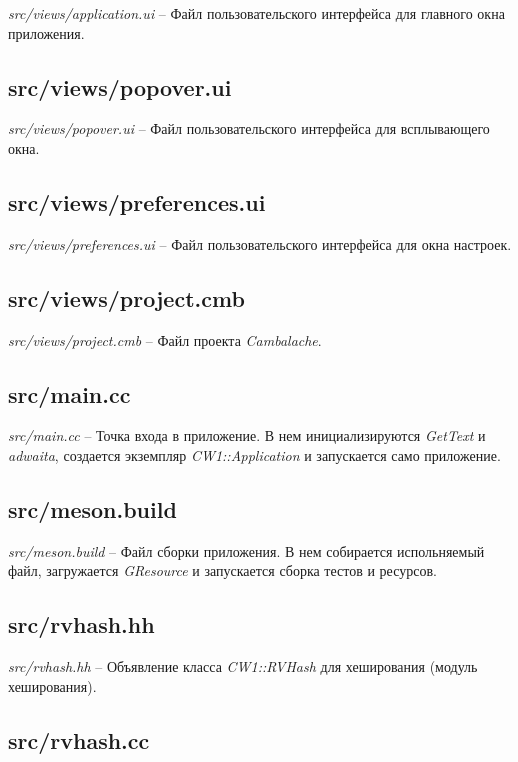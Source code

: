 \textit{src/views/application.ui} -- Файл пользовательского интерфейса для
главного окна приложения.

\subsection{src/views/popover.ui}

\textit{src/views/popover.ui} -- Файл пользовательского интерфейса для
всплывающего окна.

\subsection{src/views/preferences.ui}

\textit{src/views/preferences.ui} -- Файл пользовательского интерфейса для окна
настроек.

\subsection{src/views/project.cmb}

\textit{src/views/project.cmb} -- Файл проекта \textit{Cambalache}.

\subsection{src/main.cc}

\textit{src/main.cc} -- Точка входа в приложение. В нем инициализируются
\textit{GetText} и \textit{adwaita}, создается экземпляр
\textit{CW1::Application} и запускается само приложение.

\subsection{src/meson.build}

\textit{src/meson.build} -- Файл сборки приложения. В нем собирается
испольняемый файл, загружается \textit{GResource} и запускается сборка тестов и
ресурсов.

\subsection{src/rvhash.hh}

\textit{src/rvhash.hh} -- Объявление класса \textit{CW1::RVHash} для хеширования
(модуль хеширования).

\subsection{src/rvhash.cc}

